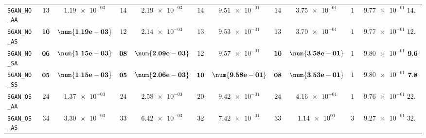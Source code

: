 \begin{xltabular}{\textwidth}{l||cC|cC|cC|cC|cC||c}
	\texttt{SGAN\_NO\_AA} & $ 13$ & $ \num{1.19e-03}$ & $ 14$ & $ \num{2.19e-03}$ & $ 14$ & $ \num{9.51e-01}$ & $ 14$ & $ \num{3.75e-01}$ & $ 16$ & $ \num{9.77e-01}$ & $ 14.2$  \\
	\texttt{SGAN\_NO\_AS} & $\bf 10$ & $\bf \num{1.19e-03}$ & $ 12$ & $ \num{2.14e-03}$ & $ 13$ & $ \num{9.53e-01}$ & $ 13$ & $ \num{3.70e-01}$ & $ 15$ & $ \num{9.77e-01}$ & $ 12.6$  \\
	\texttt{SGAN\_NO\_SA} & $\bf 06$ & $\bf \num{1.15e-03}$ & $\bf 08$ & $\bf \num{2.09e-03}$ & $ 12$ & $ \num{9.57e-01}$ & $\bf 10$ & $\bf \num{3.58e-01}$ & $ 12$ & $ \num{9.80e-01}$ & $\bf 9.6$  \\
	\texttt{SGAN\_NO\_SS} & $\bf 05$ & $\bf \num{1.15e-03}$ & $\bf 05$ & $\bf \num{2.06e-03}$ & $\bf 10$ & $\bf \num{9.58e-01}$ & $\bf 08$ & $\bf \num{3.53e-01}$ & $ 11$ & $ \num{9.80e-01}$ & $\bf 7.8$  \\
	\texttt{SGAN\_OS\_AA} & $ 24$ & $ \num{1.37e-03}$ & $ 24$ & $ \num{2.58e-03}$ & $ 20$ & $ \num{9.42e-01}$ & $ 24$ & $ \num{4.16e-01}$ & $ 18$ & $ \num{9.76e-01}$ & $ 22.0$  \\
	\texttt{SGAN\_OS\_AS} & $ 34$ & $ \num{3.30e-03}$ & $ 33$ & $ \num{6.42e-03}$ & $ 32$ & $ \num{7.42e-01}$ & $ 33$ & $ \num{1.14e+00}$ & $ 32$ & $ \num{9.27e-01}$ & $ 32.8$  \\

\end{xltabular}
